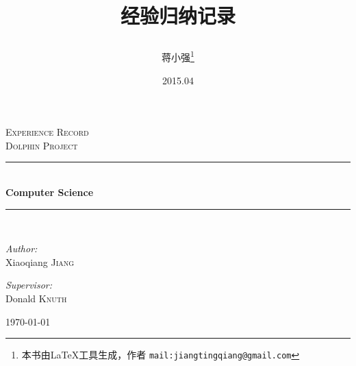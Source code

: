 \documentclass{book}
\begin{document}
\begin{titlepage}
\begin{center}

\textsc{\LARGE Experience Record}\\[1.5cm]

\textsc{Dolphin Project}\\[0.5cm]

\rule{8cm}{0.2em}\mbox{} \\[0.4cm]

{\huge \bfseries Computer Science}\\[0.4cm]

\rule{8cm}{0.2em}\mbox{} \\[1.5cm]

\begin{minipage}{0.4\textwidth}
\begin{flushleft} \large
\emph{Author:}\\
Xiaoqiang \textsc{Jiang}
\end{flushleft}
\end{minipage}

\begin{minipage}{0.4\textwidth}
\begin{flushright} \large
\emph{Supervisor:} \\
Donald \textsc{Knuth}
\end{flushright}
\end{minipage}

\vfill

{\large \today}

\end{center}
\end{titlepage}

\title{\Huge{经验归纳记录}		
\author{蒋小强\footnote{本书由\LaTeX{}工具生成，作者
\texttt{mail:jiangtingqiang@gmail.com}
}}}

\date{2015.04}	

\maketitle %
\clearpage
\mbox{}         
\clearpage
\end{document}
